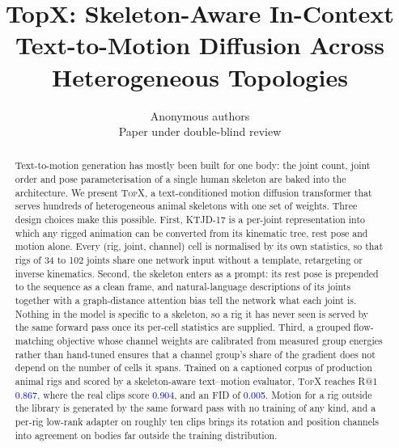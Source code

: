 \documentclass{article} %
\title{TopX: Skeleton-Aware In-Context \\ Text-to-Motion Diffusion Across Heterogeneous Topologies}
\author{Anonymous authors\\ Paper under double-blind review}
\newcommand{\method}{\textsc{TopX}}          %
\newcommand{\rep}{KTJD-17}                    %
\newcommand{\num}[1]{\textcolor{blue}{#1}}    %
\begin{document}
\maketitle

\begin{abstract}
Text-to-motion generation has mostly been built for one body: the joint count,
joint order and pose parameterisation of a single human skeleton are baked into the architecture.
We present \method{}, a text-conditioned motion diffusion transformer that serves hundreds of
heterogeneous animal skeletons with one set of weights. Three design choices make this possible. First,
\rep{} is a per-joint representation into which any rigged animation can be converted from its kinematic
tree, rest pose and motion alone. Every (rig, joint, channel) cell is normalised by its own statistics, so
that rigs of 34 to 102 joints share one network input without a template, retargeting or inverse
kinematics. Second, the skeleton enters as a prompt: its rest pose is prepended to the sequence as a clean
frame, and natural-language descriptions of its joints together with a graph-distance attention bias tell
the network what each joint is. Nothing in the model is specific to a skeleton, so a rig it has never seen
is served by the same forward pass once its per-cell statistics are supplied. Third, a grouped
flow-matching objective whose channel weights are calibrated from measured group energies rather than
hand-tuned ensures that a channel group's share of the gradient does not depend on the number of cells it
spans. Trained on a captioned corpus of production animal rigs and scored by a skeleton-aware text--motion
evaluator, \method{} reaches R@1 \num{0.867}, where the real clips score \num{0.904}, and an FID of
\num{0.005}. Motion for a rig outside the library is generated by the same forward pass with no training
of any kind, and a per-rig low-rank adapter on roughly ten clips brings its rotation and position
channels into agreement on bodies far outside the training distribution.
\end{abstract}










\newpage

\end{document}
